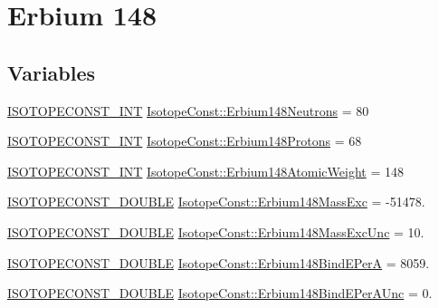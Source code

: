 \hypertarget{group___isotope_const-_erbium-_er148}{}\section{Erbium 148}
\label{group___isotope_const-_erbium-_er148}
\subsection*{Variables}
\begin{DoxyCompactItemize}
\item 
\mbox{\hyperlink{group___isotope_const-_macros_ga5f18360b3e99483a35c32d789e62621c}{I\+S\+O\+T\+O\+P\+E\+C\+O\+N\+S\+T\+\_\+\+I\+NT}} \mbox{\hyperlink{group___isotope_const-_erbium-_er148_ga40ab99f4a85e51760900f2c54916319e}{Isotope\+Const\+::\+Erbium148\+Neutrons}} = 80
\item 
\mbox{\hyperlink{group___isotope_const-_macros_ga5f18360b3e99483a35c32d789e62621c}{I\+S\+O\+T\+O\+P\+E\+C\+O\+N\+S\+T\+\_\+\+I\+NT}} \mbox{\hyperlink{group___isotope_const-_erbium-_er148_gac0799d563a3aad41354741c4a7dc277f}{Isotope\+Const\+::\+Erbium148\+Protons}} = 68
\item 
\mbox{\hyperlink{group___isotope_const-_macros_ga5f18360b3e99483a35c32d789e62621c}{I\+S\+O\+T\+O\+P\+E\+C\+O\+N\+S\+T\+\_\+\+I\+NT}} \mbox{\hyperlink{group___isotope_const-_erbium-_er148_ga8ebb9aed43184fc37fa10e8beffe3fc6}{Isotope\+Const\+::\+Erbium148\+Atomic\+Weight}} = 148
\item 
\mbox{\hyperlink{group___isotope_const-_macros_ga8f45a7272ce02c0b4c65c44636ed719a}{I\+S\+O\+T\+O\+P\+E\+C\+O\+N\+S\+T\+\_\+\+D\+O\+U\+B\+LE}} \mbox{\hyperlink{group___isotope_const-_erbium-_er148_ga9e6bfe80bbb96b09b837f6963ef2d0e0}{Isotope\+Const\+::\+Erbium148\+Mass\+Exc}} = -\/51478.
\item 
\mbox{\hyperlink{group___isotope_const-_macros_ga8f45a7272ce02c0b4c65c44636ed719a}{I\+S\+O\+T\+O\+P\+E\+C\+O\+N\+S\+T\+\_\+\+D\+O\+U\+B\+LE}} \mbox{\hyperlink{group___isotope_const-_erbium-_er148_gaa406d91044e5205e5ca535f2d109cdc9}{Isotope\+Const\+::\+Erbium148\+Mass\+Exc\+Unc}} = 10.
\item 
\mbox{\hyperlink{group___isotope_const-_macros_ga8f45a7272ce02c0b4c65c44636ed719a}{I\+S\+O\+T\+O\+P\+E\+C\+O\+N\+S\+T\+\_\+\+D\+O\+U\+B\+LE}} \mbox{\hyperlink{group___isotope_const-_erbium-_er148_gae39ef700fc05c36021930b5216ac6c9f}{Isotope\+Const\+::\+Erbium148\+Bind\+E\+PerA}} = 8059.
\item 
\mbox{\hyperlink{group___isotope_const-_macros_ga8f45a7272ce02c0b4c65c44636ed719a}{I\+S\+O\+T\+O\+P\+E\+C\+O\+N\+S\+T\+\_\+\+D\+O\+U\+B\+LE}} \mbox{\hyperlink{group___isotope_const-_erbium-_er148_ga1b3cae448fda03b55c8aa55d6174a9e2}{Isotope\+Const\+::\+Erbium148\+Bind\+E\+Per\+A\+Unc}} = 0.

\end{DoxyCompactItemize}

